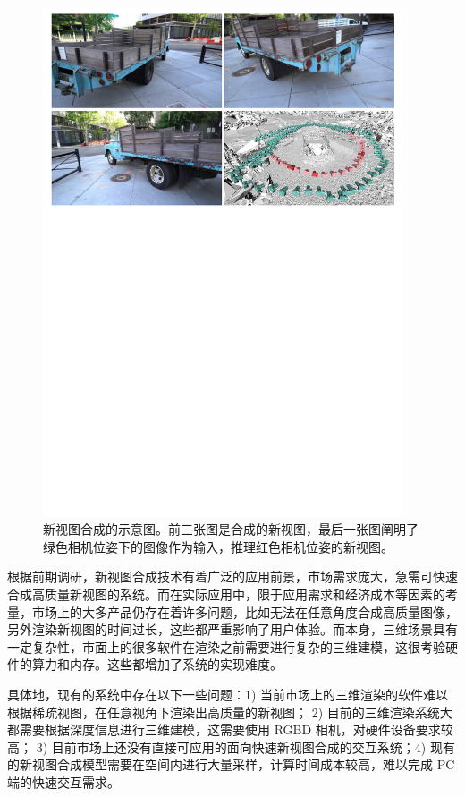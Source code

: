 \begin{figure}[tbhp]
    \centering
    \includegraphics[width=0.95\textwidth]{figures/FreeViewSynthesis.pdf}
    \caption{新视图合成的示意图\cite{riegler2020free}。前三张图是合成的新视图，最后一张图阐明了绿色相机位姿下的图像作为输入，推理红色相机位姿的新视图。}
    \label{fig:FreeViewSynthesis}
\end{figure}
\newpage

根据前期调研，新视图合成技术有着广泛的应用前景，市场需求庞大，急需可快速合成高质量新视图的系统。而在实际应用中，限于应用需求和经济成本等因素的考量，市场上的大多产品仍存在着许多问题，比如无法在任意角度合成高质量图像，另外渲染新视图的时间过长，这些都严重影响了用户体验。而本身，三维场景具有一定复杂性，市面上的很多软件在渲染之前需要进行复杂的三维建模，这很考验硬件的算力和内存。这些都增加了系统的实现难度。

具体地，现有的系统中存在以下一些问题：1) 当前市场上的三维渲染的软件难以根据稀疏视图，在任意视角下渲染出高质量的新视图；
2) 目前的三维渲染系统大都需要根据深度信息进行三维建模，这需要使用 RGBD 相机，对硬件设备要求较高；
3) 目前市场上还没有直接可应用的面向快速新视图合成的交互系统；4) 现有的新视图合成模型需要在空间内进行大量采样，计算时间成本较高，难以完成 PC 端的快速交互需求。


